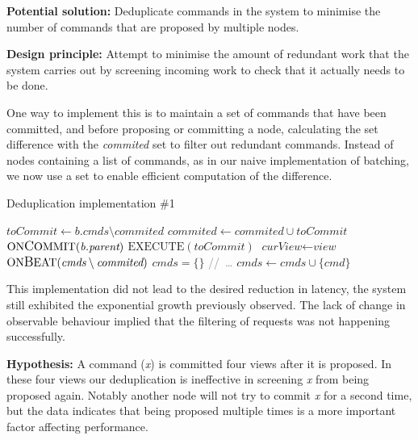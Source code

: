 \textbf{Potential solution: } Deduplicate commands in the system to minimise the number of commands that are proposed by multiple nodes.

\textbf{Design principle: } Attempt to minimise the amount of redundant work that the system carries out by screening incoming work to check that it actually needs to be done.

One way to implement this is to maintain a set of commands that have been committed, and before proposing or committing a node, calculating the set difference with the \textit{commited} set to filter out redundant commands. Instead of nodes containing a list of commands, as in our naive implementation of batching, we now use a set to enable efficient computation of the difference.

\begin{algorithm}[h!]
	\caption{Deduplication implementation \#1}
	\begin{algorithmic}[1]
			\State $\textit{toCommit} \gets \textit{b.cmds} \setminus \textit{commited} $
			\State $\textit{commited} \gets \textit{commited} \cup \textit{toCommit}$
			\State $\text{ON{\large C}OMMIT}(\textit{b.parent})$
			\State $\text{EXECUTE}(\textit{toCommit})$
		\EndIf
	\EndProcedure
		\State $ \textit{curView} \gets \textit{view}$
		\State $ \text{ON{\large B}EAT}(\textit{cmds} \setminus \textit{commited})$
		\State $ \textit{cmds} = \{\}$
		\State \textcolor{gray}{//\ \dots}
	\EndProcedure
		\State $ \textit{cmds} \gets \textit{cmds} \cup \{\textit{cmd}\} $
	\EndProcedure
	\end{algorithmic}
\end{algorithm}

This implementation did not lead to the desired reduction in latency, the system still exhibited the exponential growth previously observed. The lack of change in observable behaviour implied that the filtering of requests was not happening successfully.

\textbf{Hypothesis: } A command (\textit{x}) is committed four views after it is proposed. In these four views our deduplication is ineffective in screening \textit{x} from being proposed again. Notably another node will not try to commit \textit{x} for a second time, but the data indicates that being proposed multiple times is a more important factor affecting performance. 

